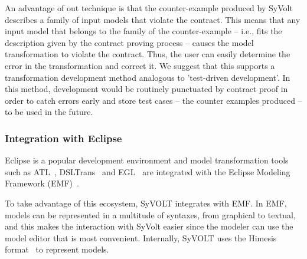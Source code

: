 An advantage of out technique is that the counter-example produced by SyVolt
describes a family of
input models that violate the contract.
This means that any input model that belongs to the family of the
counter-example -- i.e., fits the description given by the contract proving
process -- causes the model transformation to violate the contract.  Thus, the user can
easily determine the error in the transformation and correct it. We suggest that
this supports a transformation development method analogous to 'test-driven
development'. In this method, development would be routinely punctuated by
contract proof in order to catch errors early and store test cases -- the
counter examples produced -- to be used in the future.


\subsubsection{Integration with Eclipse}

 Eclipse is a popular development environment and model
transformation tools such as ATL~\cite{atlTool}, DSLTrans~\cite{Barroca2011} and
EGL~\cite{eglTool} are integrated with the Eclipse Modeling Framework
(EMF)~\cite{emfTool}.

To take advantage of this ecosystem, SyVOLT integrates with EMF.
In EMF, models can be represented in a multitude of syntaxes, from graphical
to textual, and this makes the interaction with SyVolt easier since the modeler
can use the model editor that is most convenient. Internally, SyVOLT uses 
the Himesis format~\cite{Provost2006} to represent models.


